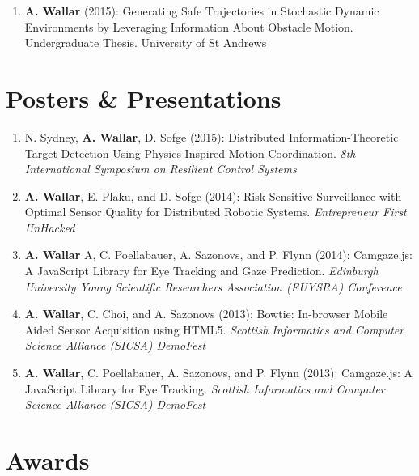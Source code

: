 \documentclass[line,margin]{cv}
\begin{document}
\begin{resume}
\begin{enumerate}
    \item \textbf{A. Wallar} (2015): Generating Safe Trajectories
        in Stochastic Dynamic Environments by Leveraging Information About
        Obstacle Motion. Undergraduate Thesis. University of St Andrews

\end{enumerate}


\section{Posters \& Presentations}

\begin{enumerate}

    \item N. Sydney, \textbf{A. Wallar}, D. Sofge (2015):
        Distributed Information-Theoretic Target Detection Using
        Physics-Inspired Motion Coordination.
        \textit{8th International Symposium on
        Resilient Control Systems}

    \item \textbf{A. Wallar}, E. Plaku, and D. Sofge (2014): Risk
        Sensitive Surveillance with Optimal Sensor Quality for Distributed
        Robotic Systems. \textit{Entrepreneur First UnHacked}

    \item \textbf{A. Wallar} A, C. Poellabauer, A. Sazonovs, and P. Flynn (2014):
        Camgaze.js: A JavaScript Library for Eye Tracking and Gaze
        Prediction. \textit{Edinburgh University Young Scientific Researchers
        Association (EUYSRA) Conference}

    \item \textbf{A. Wallar}, C. Choi, and A. Sazonovs (2013): Bowtie:
        In-browser Mobile Aided Sensor Acquisition using HTML5.
        \textit{Scottish Informatics and Computer Science Alliance
        (SICSA) DemoFest}

    \item \textbf{A. Wallar}, C. Poellabauer, A. Sazonovs, and P. Flynn (2013):
        Camgaze.js: A JavaScript Library for Eye Tracking. \textit{Scottish
        Informatics and Computer Science Alliance (SICSA) DemoFest}

\end{enumerate}

\section{Awards}


\end{resume}
\end{document}
